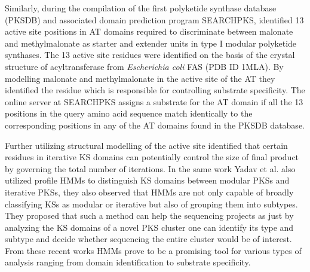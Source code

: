 \begin{doublespacing}
		Similarly, during the compilation of the first polyketide synthase database (PKSDB) and associated domain prediction program SEARCHPKS, \textcite{Yadav2003} identified 13 active site positions in AT domains required to discriminate between malonate and methylmalonate as starter and extender units in type I modular polyketide synthases. The 13 active site residues were identified on the basis of the crystal structure of acyltransferase from \textit{Escherichia coli} FAS (PDB ID 1MLA). By modelling malonate and methylmalonate in the active site of the AT they identified the residue which is responsible for controlling substrate specificity. The online server at SEARCHPKS assigns a substrate for the AT domain if all the 13 positions in the query amino acid sequence match identically to the corresponding positions in any of the AT domains found in the PKSDB database.
		
		Further utilizing structural modelling of the active site \textcite{Yadav2009} identified that certain residues in iterative KS domains can potentially control the size of final product by governing the total number of iterations. In the same work Yadav et al. also utilized profile HMMs to distinguish KS domains between modular PKSs and iterative PKSs, they also observed that HMMs are not only capable of broadly classifying KSs as modular or iterative but also of grouping them into subtypes. They proposed that such a method can help the sequencing projects as just by analyzing the KS domains of a novel PKS cluster one can identify its type and subtype and decide whether sequencing the entire cluster would be of interest. From these recent works HMMs prove to be a promising tool for various types of analysis ranging from domain identification to substrate specificity. 
		

\end{doublespacing}
